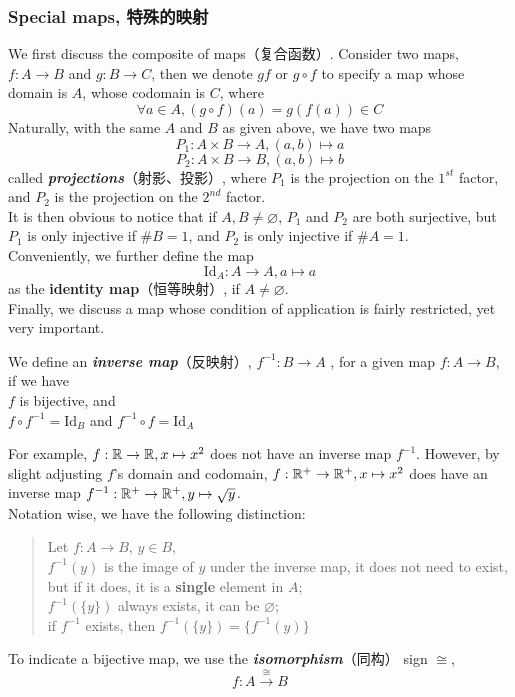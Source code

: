 \subsubsection{Special maps, 特殊的映射}
We first discuss the composite of maps（复合函数）. Consider two maps, $f: A \to B$ and $g: B \to C$, then we denote $gf$ or $g \circ f$ to specify a map whose domain is $A$, whose codomain is $C$, where
$$\forall a \in A, (g \circ f)(a) = g(f(a)) \in C$$
Naturally, with the same $A$ and $B$ as given above, we have two maps
$$P_1: A \times B \to A, (a, b) \mapsto a$$
$$P_2: A \times B \to B, (a, b) \mapsto b$$
called \textbf{\textit{projections}}（射影、投影）, where $P_1$ is the projection on the $1^{st}$ factor, and $P_2$ is the projection on the $2^{nd}$ factor. \\
It is then obvious to notice that if $A, B \ne \varnothing$, $P_1$ and $P_2$ are both surjective, but $P_1$ is only injective if $\# B = 1$, and $P_2$ is only injective if $\# A = 1$. \\
Conveniently, we further define the map
$$\text{Id}_A: A \to A, a \mapsto a$$
as the \textbf{\textbf{identity map}}（恒等映射）, if $A \ne \varnothing$. \\
Finally, we discuss a map whose condition of application is fairly restricted, yet very important.
\begin{definition}
    We define an \textbf{\textit{inverse map}}（反映射）, $f^{-1}: B \to A$ , for a given map $f: A \to B$, if we have \\
    $f$ is bijective, and \\
    $f \circ f^{-1} = \text{Id}_B$ and $f^{-1} \circ f = \text{Id}_A$
\end{definition}
For example, $f: \mathbb{R} \to \mathbb{R}, x \mapsto x^2$ does not have an inverse map $f^{-1}$. However, by slight adjusting $f$'s domain and codomain, $f: \mathbb{R}^+ \to \mathbb{R}^+, x \mapsto x^2$ does have an inverse map $f^{-1}: \mathbb{R}^+ \to \mathbb{R}^+, y \mapsto \sqrt{y}$. \\
Notation wise, we have the following distinction:
\begin{quote}
    Let $f: A \to B$, $y \in B$, \\
    $f^{-1}(y)$ is the image of $y$ under the inverse map, it does not need to exist, but if it does, it is a \textbf{single} element in $A$; \\
    $f^{-1}(\{y\})$ always exists, it can be $\varnothing$; \\
    if $f^{-1}$ exists, then $f^{-1}(\{y\}) = \{f^{-1}(y)\}$
\end{quote}
To indicate a bijective map, we use the \textbf{\textit{isomorphism}}（同构） sign $\cong$,
$$f: A \xrightarrow{\cong} B$$

